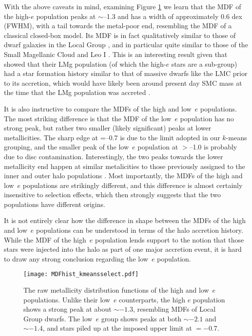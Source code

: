 With the above caveats in mind, examining Figure \ref{fig:mdfs} we
learn that the MDF of the high-$e$ population peaks at \feh{}$\sim$--1.3
and has a width of approximately 0.6 dex (FWHM), with a tail towards
the metal-poor end, resembling the MDF of a classical closed-box model.  Its MDF is in fact qualitatively similar to
those of dwarf galaxies in the Local Group
\citep[e.g.][]{2015AJ....149..198R}, and in particular quite similar
to those of the Small Magellanic Cloud \citep[SMC,][]{2014MNRAS.442.1680D}
and Leo I \citep{2013ApJ...779..102K}. This is an interesting
result given that \citet{2018ApJ...852...49H}  showed that their LMg
population (of which the high-$e$ stars are a sub-group) had a star
formation history similar to that of massive dwarfs like the LMC
prior to its accretion, which would have likely been around present day
SMC mass \citep[$\sim 3\times 10^{8} \mathrm{M_{\odot}}$,
e.g.][]{2004ApJ...604..176S,2018MNRAS.478.5017R} at the time that the LMg population was accreted
\citep{2009IAUS..256...81V,2018arXiv180606038H}.

It is also instructive to compare the MDFs of the high and low~$e$
populations.  The most striking difference is that the MDF of the
low~$e$ population has no strong peak, but rather two smaller (likely
significant) peaks at lower metallicities.  The sharp edge at
\feh{}=--0.7 is due to the \feh{} limit adopted in our $k$-means
grouping, and the smaller peak of the low~$e$ population at
\feh{}$>$--1.0 is probably due to disc contamination.  Interestingly,
the two peaks towards the lower metallicity end happen at similar
metalicities to those previously assigned to the inner and outer
halo populations \citep[e.g.][]{2007Natur.450.1020C,2014A&A...568A...7A,2015A&A...577A..81F}.  Most
importantly, the MDFs of the high and low~$e$ populations are
strikingly different, and this difference is almost certainly
insensitive to selection effects, which then strongly suggests that
the two populations have different origins.

It is not entirely clear how the difference in shape between the
MDFs of the high and low~$e$ populations can be understood in terms
of the halo accretion history.  While the MDF of the high~$e$
population lends support to the notion that those stars were injected
into the halo as part of one major accretion event, it is
hard to draw any strong conclusion regarding the low~$e$ population.

\begin{figure}
\texttt{[image: MDFhist\_kmeansselect.pdf]}
\caption{\label{fig:mdfs} The raw metallicity distribution functions of the
high and low~$e$ populations.  Unlike their low~$e$ counterparts, the high 
$e$ population shows a strong peak at about \feh{}$\sim -1.3$, resembling
MDFs of Local Group dwarfs. The low~$e$ group shows peaks at both \feh{} $\sim -2.1$ and $\sim -1.4$, and stars piled up at the imposed upper \feh{} limit at \feh{} $= -0.7$.
}
\end{figure}

